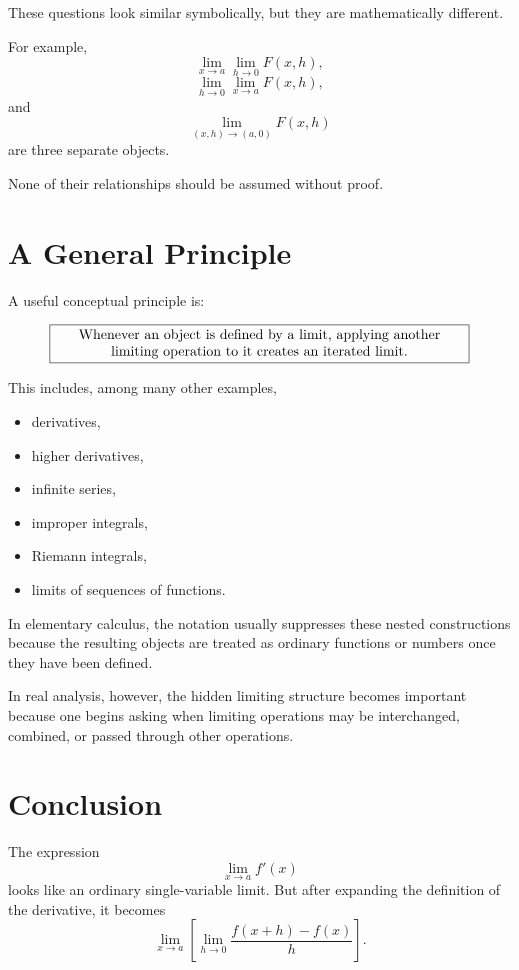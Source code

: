 \documentclass{essay}
\begin{document}
These questions look similar symbolically, but they are mathematically different.

For example,
\[ \lim_{x\to a}\lim_{h\to0}F(x,h), \]
\[ \lim_{h\to0}\lim_{x\to a}F(x,h), \]
and
\[ \lim_{(x,h)\to(a,0)}F(x,h) \]
are three separate objects.

None of their relationships should be assumed without proof.

\section{A General Principle}

A useful conceptual principle is:

\[ \boxed{ \begin{minipage}{0.85\linewidth} \centering Whenever an object is defined by a limit, applying another limiting operation to it creates an iterated limit. \end{minipage} } \]

This includes, among many other examples,

\begin{itemize}
  \item derivatives,
  \item higher derivatives,
  \item infinite series,
  \item improper integrals,
  \item Riemann integrals,
  \item limits of sequences of functions.
\end{itemize}

In elementary calculus, the notation usually suppresses these nested constructions because the resulting objects are treated as ordinary functions or numbers once they have been defined.

In real analysis, however, the hidden limiting structure becomes important because one begins asking when limiting operations may be interchanged, combined, or passed through other operations.

\section{Conclusion}

The expression
\[ \lim_{x\to a}f'(x) \]
looks like an ordinary single-variable limit. But after expanding the definition of the derivative, it becomes
\[ \lim_{x\to a} \left[ \lim_{h\to0} \frac{f(x+h)-f(x)}{h} \right]. \]
\end{document}

